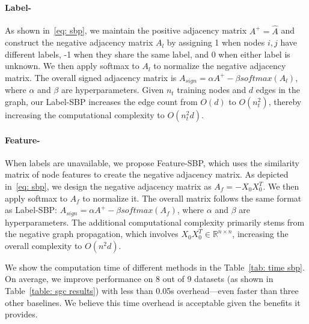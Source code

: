 \section{}
\label{app: time complexity of sbp}
\paragraph{Label-\ours}
As shown in~\eqref{eq: sbp}, we maintain the positive adjacency matrix $A^+=\hat{A}$ and construct the negative adjacency matrix $A_{l}$ by assigning 1 when nodes $i,j$ have different labels, -1 when they share the same label, and 0 when either label is unknown.
We then apply softmax to $A_{l}$ to normalize the negative adjacency matrix. The overall signed adjacency matrix is $A_{sign}= \alpha A^+ - \beta softmax(A_{l})$, where $\alpha$ and $\beta$ are hyperparameters.
Given $n_t$ training nodes and $d$ edges in the graph, our Label-SBP increases the edge count from $O(d)$ to $O(n_t^2)$, thereby increasing the computational complexity to $O(n_t^2d)$.

\paragraph{Feature-\ours}
When labels are unavailable, we propose Feature-SBP, which uses the similarity matrix of node features to create the negative adjacency matrix.
As depicted in~\eqref{eq: sbp}, we design the negative adjacency matrix as $A_{f}=-X_{0}X_{0}^T$. We then apply softmax to $A_{f}$ to normalize it. The overall matrix follows the same format as Label-SBP: $A_{sign}= \alpha A^+ - \beta softmax(A_{f})$, where $\alpha$ and $\beta$ are hyperparameters.
The additional computational complexity primarily stems from the negative graph propagation, which involves $X_{0}X_{0}^T \in \mathbb{R}^{n\times n}$, increasing the overall complexity to $O(n^2d)$.

We show the computation time of different methods in the Table~\ref{tab: time sbp}. On average, we improve performance on 8 out of 9 datasets (as shown in Table~\ref{table: sgc results}) with less than 0.05s overhead—even faster than three other baselines. 
We believe this time overhead is acceptable given the benefits it provides.

